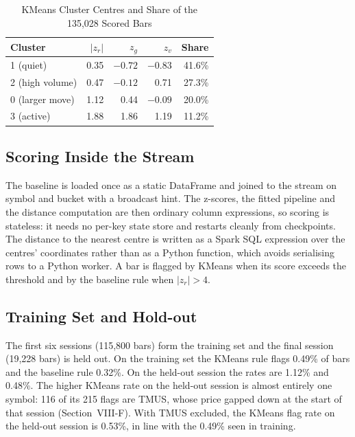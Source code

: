 \documentclass[conference]{IEEEtran}
\begin{document}
\begin{table}[t]
\caption{KMeans Cluster Centres and Share of the 135,028 Scored Bars}
\label{tab:centres}
\centering
\small
\begin{tabular}{@{}lrrrr@{}}
\toprule
Cluster & $|z_r|$ & $z_g$ & $z_v$ & Share \\
\midrule
1 (quiet) & 0.35 & $-0.72$ & $-0.83$ & 41.6\% \\
2 (high volume) & 0.47 & $-0.12$ & 0.71 & 27.3\% \\
0 (larger move) & 1.12 & 0.44 & $-0.09$ & 20.0\% \\
3 (active) & 1.88 & 1.86 & 1.19 & 11.2\% \\
\bottomrule
\end{tabular}
\end{table}

\subsection{Scoring Inside the Stream}
The baseline is loaded once as a static DataFrame and joined to the stream on symbol and bucket with a broadcast hint. The z-scores, the fitted pipeline and the distance computation are then ordinary column expressions, so scoring is stateless: it needs no per-key state store and restarts cleanly from checkpoints. The distance to the nearest centre is written as a Spark SQL expression over the centres' coordinates rather than as a Python function, which avoids serialising rows to a Python worker. A bar is flagged by KMeans when its score exceeds the threshold and by the baseline rule when $|z_r|>4$.

\subsection{Training Set and Hold-out}
The first six sessions (115,800 bars) form the training set and the final session (19,228 bars) is held out. On the training set the KMeans rule flags 0.49\% of bars and the baseline rule 0.32\%. On the held-out session the rates are 1.12\% and 0.48\%. The higher KMeans rate on the held-out session is almost entirely one symbol: 116 of its 215 flags are TMUS, whose price gapped down at the start of that session (Section~VIII-F). With TMUS excluded, the KMeans flag rate on the held-out session is 0.53\%, in line with the 0.49\% seen in training.
\end{document}
